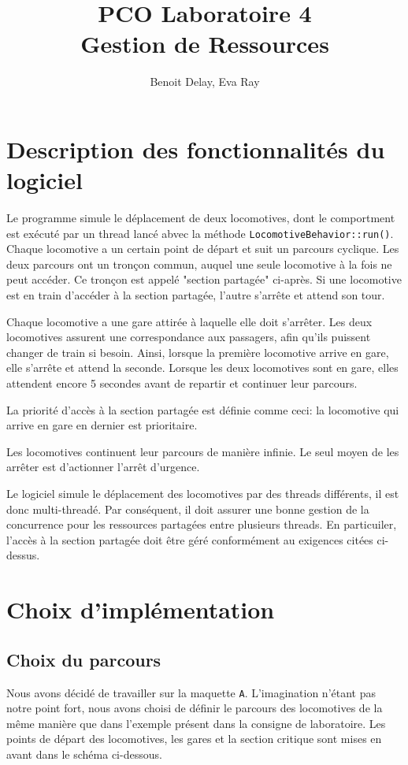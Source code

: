 \documentclass{article}
\title{PCO Laboratoire 4 \\
\large Gestion de Ressources}
\author{Benoit Delay, Eva Ray}
\begin{document}
\maketitle

\section*{Description des fonctionnalités du logiciel}

Le programme simule le déplacement de deux locomotives, dont le comportment est exécuté par un thread lancé abvec la méthode \texttt{LocomotiveBehavior::run()}. 
Chaque locomotive a un certain point de départ et suit un parcours cyclique. Les deux
parcours ont un tronçon commun, auquel une seule locomotive à la fois ne peut accéder. Ce tronçon est appelé "section partagée" ci-après. Si une
locomotive est en train d'accéder à la section partagée, l'autre s'arrête et attend son tour. 

Chaque locomotive a une gare attirée à laquelle elle doit s'arrêter. Les deux locomotives assurent une correspondance aux passagers, 
afin qu'ils puissent changer de train si besoin. Ainsi, lorsque la première locomotive arrive en gare, elle s'arrête et attend la seconde. 
Lorsque les deux locomotives sont en gare, elles attendent encore 5 secondes avant de repartir et continuer leur parcours. 

La priorité d'accès à la section partagée est définie comme ceci: la locomotive qui arrive en gare en dernier est prioritaire. 

Les locomotives continuent leur parcours de manière infinie. Le seul moyen de les arrêter est d'actionner l'arrêt d'urgence. 

Le logiciel simule le déplacement des locomotives par des threads différents, il est donc multi-threadé. Par conséquent, il doit 
assurer une bonne gestion de la concurrence pour les ressources partagées entre plusieurs threads. En particuiler, l'accès à la section
partagée doit être géré conformément au exigences citées ci-dessus. 

\section*{Choix d'implémentation}
\subsection*{Choix du parcours}
Nous avons décidé de travailler sur la maquette \texttt{A}. L'imagination n'étant pas notre point fort, nous avons choisi de définir le parcours des
locomotives de la même manière que dans l'exemple présent dans la consigne de laboratoire. Les points de départ des locomotives, les gares et la
section critique sont mises en avant dans le schéma ci-dessous. 
\end{document}
